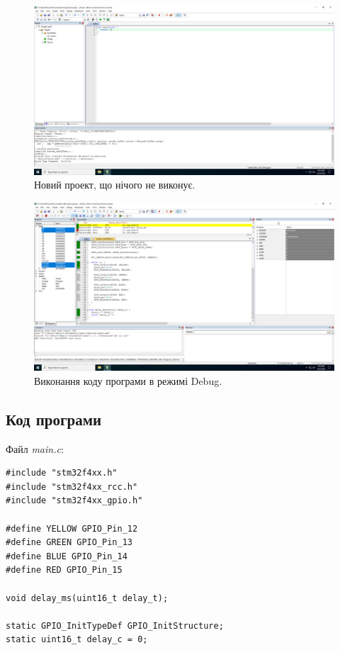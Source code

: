 \documentclass[oneside,14pt]{extarticle}
\begin{document}
\begin{normalsize}
	\begin{figure}[H]
		\centering
		\includegraphics[scale=0.3]{3}
		\caption{Новий проект, що нічого не виконує.}
	\end{figure}
	
	\begin{figure}[H]
		\centering
		\includegraphics[scale=0.3]{4}
		\caption{Виконання коду програми в режимі Debug.}
	\end{figure}

	\subsection*{Код програми}
	Файл \textit{main.c}:
	{\small
		\begin{lstlisting}
#include "stm32f4xx.h"
#include "stm32f4xx_rcc.h"
#include "stm32f4xx_gpio.h"

#define YELLOW GPIO_Pin_12
#define GREEN GPIO_Pin_13
#define BLUE GPIO_Pin_14
#define RED GPIO_Pin_15

void delay_ms(uint16_t delay_t);

static GPIO_InitTypeDef GPIO_InitStructure;
static uint16_t delay_c = 0;


\end{lstlisting}}
\end{normalsize}
\end{document}
